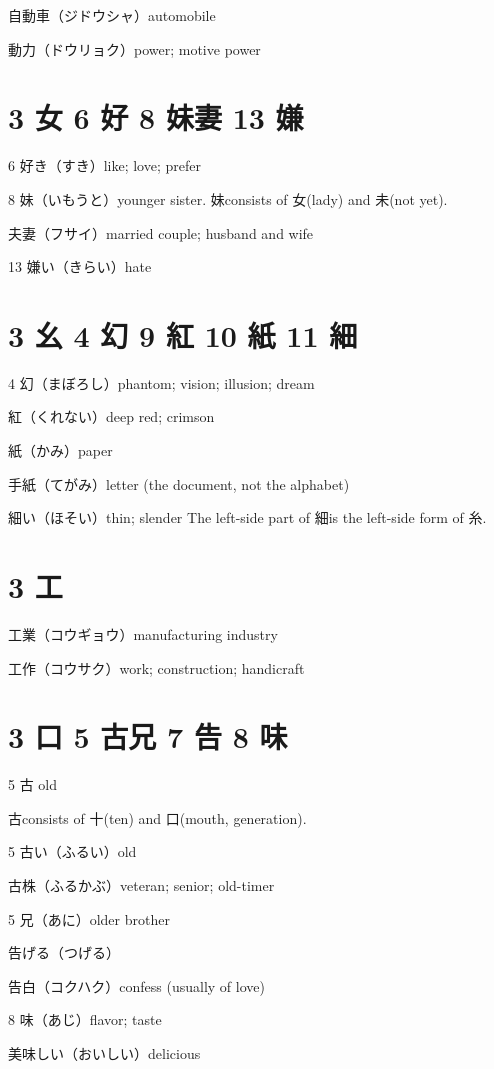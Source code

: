 自動車（ジドウシャ）automobile

動力（ドウリョク）power; motive power

\section{3 女 6 好 8 妹妻 13 嫌}

6 好き（すき）like; love; prefer

8 妹（いもうと）younger sister.
妹consists of 女(lady) and 未(not yet).

夫妻（フサイ）married couple; husband and wife

13 嫌い（きらい）hate

\section{3 幺 4 幻 9 紅 10 紙 11 細}

4 幻（まぼろし）phantom; vision; illusion; dream

紅（くれない）deep red; crimson

紙（かみ）paper

手紙（てがみ）letter (the document, not the alphabet)

細い（ほそい）thin; slender
The left-side part of 細is the left-side form of 糸.

\section{3 工}

工業（コウギョウ）manufacturing industry

工作（コウサク）work; construction; handicraft

\section{3 口 5 古兄 7 告 8 味}

5 古 old

古consists of 十(ten) and 口(mouth, generation).

5 古い（ふるい）old

古株（ふるかぶ）veteran; senior; old-timer

5 兄（あに）older brother

告げる（つげる）

告白（コクハク）confess (usually of love)

8 味（あじ）flavor; taste

美味しい（おいしい）delicious

